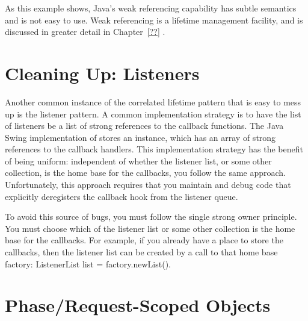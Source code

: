 As this example shows,  Java's weak referencing capability has subtle
semantics and is not easy to use. Weak referencing is a lifetime management
facility, and is discussed in greater detail in Chapter~\ref{??} .


\section{Cleaning Up: Listeners}

Another common instance of the correlated lifetime pattern that is easy to mess
up is the listener pattern. A common implementation strategy is to have the list
of listeners be a list of strong references to the callback functions. The Java
Swing implementation of  stores an 
instance, which has an array of strong references to the callback handlers. This
implementation strategy has the benefit of being uniform: independent of whether
the listener list, or some other collection, is the home base for the callbacks,
you follow the same approach. Unfortunately, this approach requires that you
maintain and debug code that explicitly deregisters the callback hook from the
listener queue.

To avoid this source of bugs, you must follow the single strong owner principle.
You must choose which of the listener list or some other collection is the home
base for the callbacks. For example, if you already have a place to store the
callbacks, then the listener list can be created by a call to that home base
factory: {ListenerList list = factory.newList()}.  

\section{Phase/Request-Scoped Objects}

